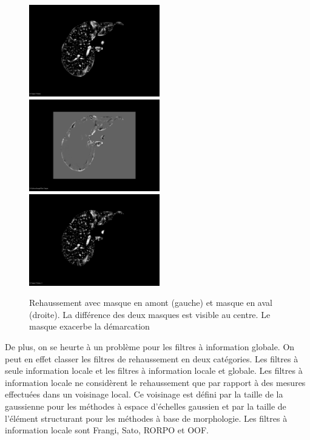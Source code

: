\begin{figure}[h]
  \centering
  \includegraphics[height=4cm]{Images/output_maskedFirst.png}
  \includegraphics[height=4cm]{Images/output_masking_diff.png}
  \includegraphics[height=4cm]{Images/output_unmasked.png}
  \label{fig:mask_intensity_profile}
  \caption{Rehaussement avec masque en amont (gauche) et masque en aval (droite). La différence des deux masques est visible au centre. Le masque exacerbe la démarcation}
\end{figure}

De plus, on se heurte à un problème pour les filtres à information globale. On peut en effet classer les filtres de rehaussement en deux catégories. Les filtres à seule information locale et les filtres à information locale et globale. Les filtres à information locale ne considèrent le rehaussement que par rapport à des mesures effectuées dans un voisinage local. Ce voisinage est défini par la taille de la gaussienne pour les méthodes à espace d'échelles gaussien et par la taille de l'élément structurant pour les méthodes à base de morphologie. Les filtres à information locale sont Frangi, Sato, RORPO et OOF.

